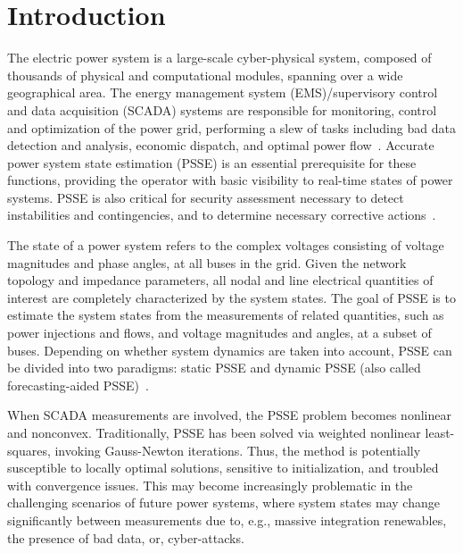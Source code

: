 \documentclass[conference]{IEEEtran}
\begin{document}
\section{Introduction}
\label{sec1}
The electric power system is a large-scale cyber-physical system, composed of thousands of physical and computational modules, spanning over a wide geographical area. The energy management system (EMS)/supervisory control and data acquisition (SCADA) systems are responsible for monitoring, control and optimization of the power grid, performing a slew of tasks including bad data detection and analysis, economic dispatch, and optimal power flow~\cite{book:abur2004, ieee:monticelli2000, spm:giannakis2013}. Accurate power system state estimation (PSSE) is an essential prerequisite for these functions, providing the operator with basic visibility to real-time states of power systems. PSSE is also critical for security assessment necessary to detect instabilities and contingencies, and to determine necessary corrective actions~\cite{spm:huang2012}.




The state of a power system refers to the complex voltages consisting of voltage magnitudes and phase angles, at all buses in the grid. Given the network topology and impedance parameters, all nodal and line electrical quantities of interest are completely characterized by the system states. The goal of PSSE is to estimate the system states from the measurements of related quantities, such as power injections and flows, and voltage magnitudes and angles, at a subset of buses. Depending on whether system dynamics are taken into account, PSSE can be divided into two paradigms: static PSSE and dynamic PSSE (also called forecasting-aided PSSE)~\cite{spm:huang2012}.

When SCADA measurements are involved, the PSSE problem becomes nonlinear and nonconvex. Traditionally, PSSE has been solved via weighted nonlinear least-squares, invoking Gauss-Newton iterations. Thus, the method is potentially susceptible to locally optimal solutions, sensitive to initialization, and troubled with convergence issues. This may become increasingly problematic in the challenging scenarios of future power systems, where system states may change significantly between measurements due to, e.g., massive integration renewables, the presence of bad data, or, cyber-attacks.
\end{document}
